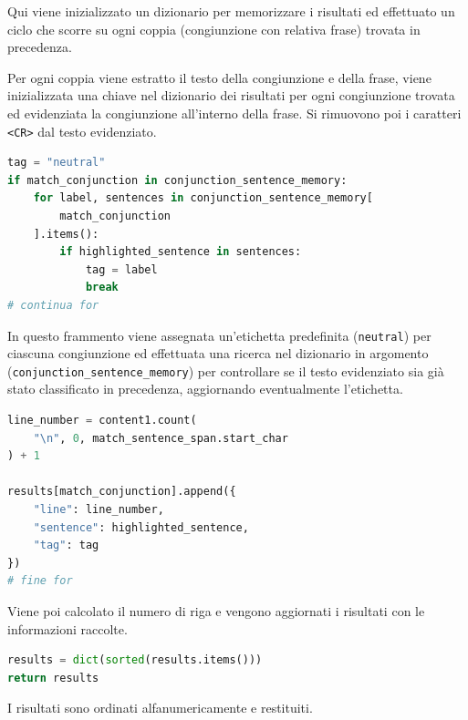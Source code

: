 \documentclass[12pt]{report}
\begin{document}
\noindent Qui viene inizializzato un dizionario per memorizzare i risultati ed effettuato un ciclo che scorre su ogni coppia (congiunzione con relativa frase) trovata in precedenza.

Per ogni coppia viene estratto il testo della congiunzione e della frase, viene inizializzata una chiave nel dizionario dei risultati per ogni congiunzione trovata ed evidenziata la congiunzione all'interno della frase. Si rimuovono poi i caratteri \texttt{<CR>} dal testo evidenziato.


\begin{mdframed}
\small
\begin{lstlisting}[language=Python]
tag = "neutral"
if match_conjunction in conjunction_sentence_memory:
    for label, sentences in conjunction_sentence_memory[
        match_conjunction
    ].items():
        if highlighted_sentence in sentences:
            tag = label
            break
# continua for
\end{lstlisting}
\end{mdframed}

\noindent In questo frammento viene assegnata un'etichetta predefinita (\texttt{neutral}) per ciascuna congiunzione ed effettuata una ricerca nel dizionario in argomento (\texttt{conjunction\_sentence\_memory}) per controllare se il testo evidenziato sia già stato classificato in precedenza, aggiornando eventualmente l'etichetta.


\begin{mdframed}
\small
\begin{lstlisting}[language=Python]
line_number = content1.count(
    "\n", 0, match_sentence_span.start_char
) + 1

results[match_conjunction].append({
    "line": line_number,
    "sentence": highlighted_sentence,
    "tag": tag
})
# fine for
\end{lstlisting}
\end{mdframed}

\noindent Viene poi calcolato il numero di riga e vengono aggiornati i risultati con le informazioni raccolte.


\begin{mdframed}
\small
\begin{lstlisting}[language=Python]
results = dict(sorted(results.items()))
return results
\end{lstlisting}
\end{mdframed}

\noindent I risultati sono ordinati alfanumericamente e restituiti.
\end{document}
